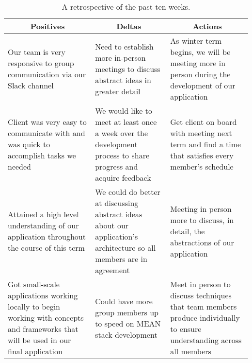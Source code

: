 \documentclass[journal,10pt,onecolumn,compsoc]{IEEEtran} \usepackage[margin=1.0in]{geometry} \usepackage{pdfpages}
\begin{document}
    \begin{table}[H]
    \begin{center}
     \begin{tabular}{ |p{}|p{}|p{}|} 
     \hline
     \multicolumn{1}{|c|}{\textbf{Positives}} 
     & 
    \multicolumn{1}{|c|}{\textbf{Deltas}}  & 
    \multicolumn{1}{|c|}{\textbf{Actions}}\\
     \hline
     
    Our team is very responsive to group communication via our Slack channel & Need to establish more in-person meetings to discuss abstract ideas in greater detail & As winter term begins, we will be meeting more in person during the development of our application \\
     \hline
     
    Client was very easy to communicate with and was quick to accomplish tasks we needed & We would like to meet at least once a week over the development process to share progress and acquire feedback & Get client on board with meeting next term and find a time that satisfies every member's schedule\\
     \hline
     
    Attained a high level understanding of our application throughout the course of this term & We could do better at discussing abstract ideas about our application's architecture so all members are in agreement & Meeting in person more to discuss, in detail, the abstractions of our application\\
     \hline
     
    Got small-scale applications working locally to begin working with concepts and frameworks that will be used in our final application & Could have more group members up to speed on MEAN stack development & Meet in person to discuss techniques that team members produce individually to ensure understanding across all members\\
     \hline
    \end{tabular}
    \caption{A retrospective of the past ten weeks.}
    \label{table:1}
    \end{center}
    \end{table}
    \newpage
\end{document}
